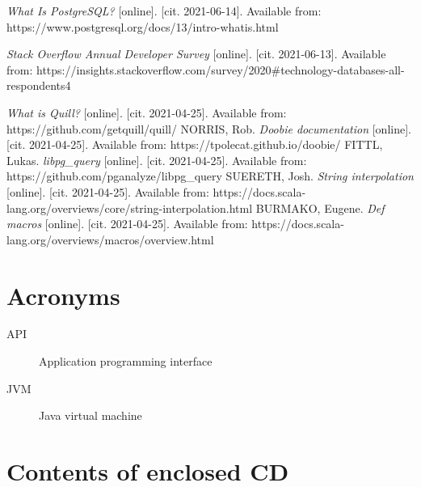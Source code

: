 \documentclass[thesis=B,english]{FITthesis}[2019/12/23]
\begin{document}


\begin{thebibliography}{9}

\textit {What Is PostgreSQL?} [online]. [cit. 2021-06-14]. Available from:
https://www.postgresql.org/docs/13/intro-whatis.html

\textit {Stack Overflow Annual Developer Survey} [online]. [cit. 2021-06-13]. Available from: https://insights.stackoverflow.com/survey/2020\#technology-databases-all-respondents4

\textit {What is Quill?} [online]. [cit. 2021-04-25]. Available from: https://github.com/getquill/quill/
NORRIS, Rob. 
\textit {Doobie documentation} [online]. [cit. 2021-04-25]. Available from: https://tpolecat.github.io/doobie/
FITTL, Lukas.
\textit {libpg\_query} [online]. [cit. 2021-04-25]. Available from:
https://github.com/pganalyze/libpg\_query
SUERETH, Josh. 
\textit {String interpolation} [online]. [cit. 2021-04-25]. Available from: https://docs.scala-lang.org/overviews/core/string-interpolation.html
BURMAKO, Eugene. 
\textit {Def macros} [online]. [cit. 2021-04-25]. Available from: https://docs.scala-lang.org/overviews/macros/overview.html


\end{thebibliography}
\appendix

\chapter{Acronyms}
\begin{description}
	\item[API] Application programming interface
	\item[JVM] Java virtual machine
\end{description}


\chapter{Contents of enclosed CD}


\begin{figure}
\end{figure}
\end{document}
